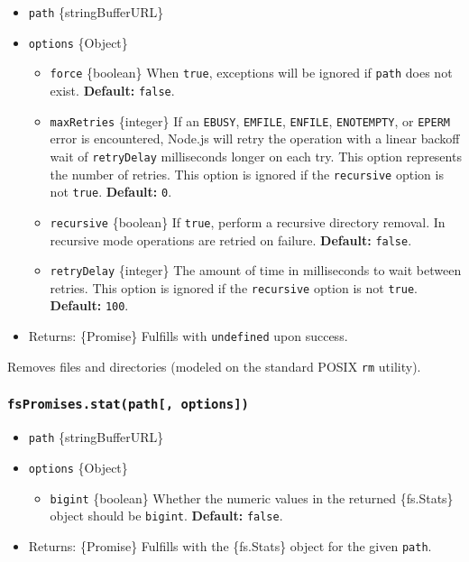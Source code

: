 \begin{itemize}
\tightlist
\item
  \texttt{path} \{string\textbar Buffer\textbar URL\}
\item
  \texttt{options} \{Object\}

  \begin{itemize}
  \tightlist
  \item
    \texttt{force} \{boolean\} When \texttt{true}, exceptions will be
    ignored if \texttt{path} does not exist. \textbf{Default:}
    \texttt{false}.
  \item
    \texttt{maxRetries} \{integer\} If an \texttt{EBUSY},
    \texttt{EMFILE}, \texttt{ENFILE}, \texttt{ENOTEMPTY}, or
    \texttt{EPERM} error is encountered, Node.js will retry the
    operation with a linear backoff wait of \texttt{retryDelay}
    milliseconds longer on each try. This option represents the number
    of retries. This option is ignored if the \texttt{recursive} option
    is not \texttt{true}. \textbf{Default:} \texttt{0}.
  \item
    \texttt{recursive} \{boolean\} If \texttt{true}, perform a recursive
    directory removal. In recursive mode operations are retried on
    failure. \textbf{Default:} \texttt{false}.
  \item
    \texttt{retryDelay} \{integer\} The amount of time in milliseconds
    to wait between retries. This option is ignored if the
    \texttt{recursive} option is not \texttt{true}. \textbf{Default:}
    \texttt{100}.
  \end{itemize}
\item
  Returns: \{Promise\} Fulfills with \texttt{undefined} upon success.
\end{itemize}

Removes files and directories (modeled on the standard POSIX \texttt{rm}
utility).

\subsubsection{\texorpdfstring{\texttt{fsPromises.stat(path{[},\ options{]})}}{fsPromises.stat(path{[}, options{]})}}\label{fspromises.statpath-options}

\begin{itemize}
\tightlist
\item
  \texttt{path} \{string\textbar Buffer\textbar URL\}
\item
  \texttt{options} \{Object\}

  \begin{itemize}
  \tightlist
  \item
    \texttt{bigint} \{boolean\} Whether the numeric values in the
    returned \{fs.Stats\} object should be \texttt{bigint}.
    \textbf{Default:} \texttt{false}.
  \end{itemize}
\item
  Returns: \{Promise\} Fulfills with the \{fs.Stats\} object for the
  given \texttt{path}.
\end{itemize}


